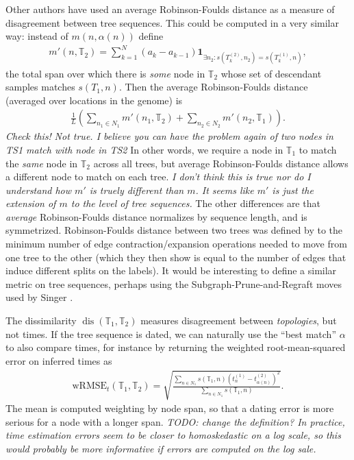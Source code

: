 \documentclass[10pt,twoside,lineno]{gsajnl}
\newcommand{\T}{\mathbb{T}}
\newcommand{\ind}{\mathbf{1}}
\newcommand{\dis}{\operatorname{dis}}
\newcommand{\comment}[1]{{\color{violet} \it #1}}
\begin{document}
Other authors \citep[e.g.,]{kelleher2019inferring} have used
an average Robinson-Foulds distance \citep{robinson1981comparison}
as a measure of disagreement between tree sequences.
This could be computed in a very similar way:
instead of $m(n, \alpha(n))$ define
\begin{align*}
    m'(n, \T_2) = \sum_{k=1}^N (a_k - a_{k-1}) \ind_{\exists n_2: s(T^{(2)}_k, n_2) = s(T^{(1)}_k, n)} ,
\end{align*}
the total span over which there is \emph{some} node in $\T_2$ whose set of descendant samples
matches $s(T_1,n)$.
Then the average Robinson-Foulds distance (averaged over locations in the genome)
is
\begin{align*}
    \frac{1}{L} \left( \sum_{n_1 \in N_1} m'(n_1, \T_2)  + \sum_{n_2 \in N_2} m'(n_2, \T_1) \right).
\end{align*}
\comment{Check this!}\comment{Not true. I believe you can have the problem again of two nodes in TS1 match with node in TS2}
In other words, we require a node in $\T_1$ to match the \emph{same} node in $\T_2$
across all trees, but average Robinson-Foulds distance allows a different node to match
on each tree. \comment{I don't think this is true nor do I understand how $m'$ is truely different than $m$. It seems like $m'$ is just the extension of $m$ to the level of tree sequences.}
The other differences are that \emph{average} Robinson-Foulds distance
normalizes by sequence length, and is symmetrized.
Robinson-Foulds distance between two trees
was defined by \citet{robinson1981comparison}
to the minimum number of edge contraction/expansion operations needed to move
from one tree to the other
(which they then show is equal to the number of edges that induce different splits on the labels).
It would be interesting to define a similar metric on tree sequences,
perhaps using the Subgraph-Prune-and-Regraft moves used by Singer \citet{deng2024robust}.

The dissimilarity $\dis(\T_1, \T_2)$ measures disagreement between \emph{topologies},
but not times.
If the tree sequence is dated, we can naturally use the ``best match'' $\alpha$
to also compare times,
for instance by returning the weighted root-mean-squared error on inferred times as
\begin{align*}
    \text{wRMSE}_t(\T_1, \T_2)
    = \sqrt{\frac{
        \sum_{n \in N_1} s(\T_1,n) \left(t^{(1)}_n - t^{(2)}_{\alpha(n)} \right)^2 
    }{
        \sum_{n \in N_1} s(\T_1,n)
    } } .
\end{align*}
The mean is computed weighting by node span, so that a dating error
is more serious for a node with a longer span.
\comment{TODO: change the definition?
In practice, time estimation errors seem to be closer to homoskedastic on a log scale,
so this would probably be more informative if errors are computed on the log sale.} 
\end{document}
